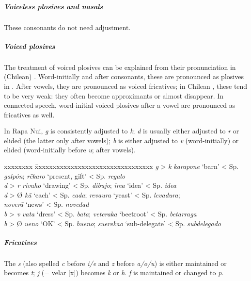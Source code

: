 \subparagraph{Voiceless plosives and nasals} These consonants do not need adjustment.

\subparagraph{Voiced plosives} The treatment of voiced plosives can be explained from their pronunciation in (Chilean) . Word-initially and after consonants, these are pronounced as plosives in . After vowels, they are pronounced as voiced fricatives; in Chilean , these tend to be very weak: they often become approximants or almost disappear. In connected speech, word-initial voiced plosives after a vowel are pronounced as fricatives as well.

In Rapa Nui,  \textit{g} is consistently adjusted to \textit{k}; \textit{d} is usually either adjusted to \textit{r} or elided (the latter only after vowels); \textit{b} is either adjusted to \textit{v} (word-initially) or elided (word-initially before \textit{u}; after vowels). 
\ea
\begin{tabbing}
 xxxxxxxx \= xxxxxxxxxxxxxxxxxxxxxxxxxxxxxxxxx\kill
 \textit{g} > \textit{k} \>  \textit{karapone} ‘barn’ {\textless} Sp. \textit{galpón}; \textit{rēkaro} ‘present, gift’ {\textless} Sp. \textit{regalo} \\
 \textit{d} > \textit{r} \>  \textit{rivuho} ‘drawing’ {\textless} Sp. \textit{dibujo}; \textit{{\ꞌ}īrea} ‘idea’ {\textless} Sp. \textit{idea} \\
 \textit{d} > Ø \>  \textit{kā} ‘each’ {\textless} Sp. \textit{cada}; \textit{revaura} ‘yeast’ {\textless} Sp. \textit{levadura}; \\
 \> \textit{noverā} ‘news’ {\textless} Sp. \textit{novedad} \\
 \textit{b} > \textit{v} \>  \textit{vata} ‘dress’ {\textless} Sp. \textit{bata}; \textit{veteraka} ‘beetroot’ {\textless} Sp. \textit{betarraga} \\
 \textit{b} > Ø \>  \textit{ueno} ‘OK’ {\textless} Sp. \textit{bueno}; \textit{suerekao} ‘sub-delegate’ {\textless} Sp. \textit{subdelegado}
\end{tabbing}
\z 
\subparagraph{Fricatives} The  \textit{s} (also spelled \textit{c} before \textit{i/e} and \textit{z} before \textit{a/o/u}) is either maintained or becomes \textit{t}; \textit{j} (= velar  [x]) becomes \textit{k} or \textit{h}. \textit{f} is maintained or changed to \textit{p}.

